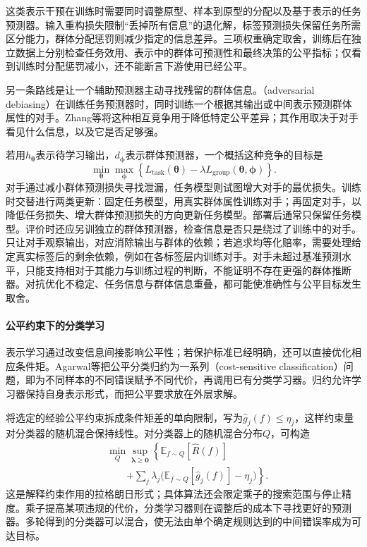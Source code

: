 这类表示干预在训练时需要同时调整原型、样本到原型的分配以及基于表示的任务预测器。输入重构损失限制“丢掉所有信息”的退化解，标签预测损失保留任务所需区分能力，群体分配惩罚则减少指定的信息差异。三项权重确定取舍，训练后在独立数据上分别检查任务效用、表示中的群体可预测性和最终决策的公平指标；仅看到训练时分配惩罚减小，还不能断言下游使用已经公平。

另一条路线是让一个辅助预测器主动寻找残留的群体信息。（adversarial debiasing）在训练任务预测器时，同时训练一个根据其输出或中间表示预测群体属性的对手。Zhang等将这种相互竞争用于降低特定公平差异；其作用取决于对手看见什么信息，以及它是否足够强。

若用$h_{\bm{\theta}}$表示待学习输出，$d_{\bm{\phi}}$表示群体预测器，一个概括这种竞争的目标是
\[
 \min_{\bm{\theta}}\max_{\bm{\phi}}
 \left\{L_{\mathrm{task}}(\bm{\theta})
       -\lambda L_{\mathrm{group}}(\bm{\theta},\bm{\phi})\right\}.
\]
对手通过减小群体预测损失寻找泄漏，任务模型则试图增大对手的最优损失。训练时交替进行两类更新：固定任务模型，用真实群体属性训练对手；再固定对手，以降低任务损失、增大群体预测损失的方向更新任务模型。部署后通常只保留任务模型。评价时还应另训独立的群体预测器，检查信息是否只是绕过了训练中的对手。只让对手观察输出，对应消除输出与群体的依赖；若追求均等化赔率，需要处理给定真实标签后的剩余依赖，例如在各标签层内训练对手。对手未超过基准预测水平，只能支持相对于其能力与训练过程的判断，不能证明不存在更强的群体推断器。对抗优化不稳定、任务信息与群体信息重叠，都可能使准确性与公平目标发生取舍。

\paragraph{公平约束下的分类学习}

表示学习通过改变信息间接影响公平性；若保护标准已经明确，还可以直接优化相应条件矩。Agarwal等把公平分类归约为一系列（cost-sensitive classification）问题，即为不同样本的不同错误赋予不同代价，再调用已有分类学习器。归约允许学习器保持自身表示形式，而把公平要求放在外层求解。

将选定的经验公平约束拆成条件矩差的单向限制，写为$\hat g_j(f)\leq\eta_j$，这样约束量对分类器的随机混合保持线性。对分类器上的随机混合分布$Q$，可构造
\begin{equation}
\begin{aligned}
 &\min_Q\sup_{\bm{\lambda}\geq\bm{0}}
 \left\{\mathbb E_{f\sim Q}[\hat R(f)]\right.\\
 &\qquad\left.+
 \sum_j\lambda_j
 \bigl(\mathbb E_{f\sim Q}[\hat g_j(f)]-\eta_j\bigr)
 \right\}.
\end{aligned}
 \label{eq:fairness-reduction}
\end{equation}
这是解释约束作用的拉格朗日形式；具体算法还会限定乘子的搜索范围与停止精度。乘子提高某项违规的代价，分类学习器则在调整后的成本下寻找更好的预测器。多轮得到的分类器可以混合，使无法由单个确定规则达到的中间错误率成为可达目标。

